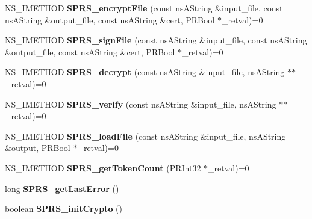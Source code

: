\begin{DoxyCompactItemize}
\item 
\hypertarget{classnsISPRS__PKCS11__Wrapper_af54922c905efcea0787d2a874d9a89a5}{
NS\_\-IMETHOD {\bfseries SPRS\_\-encryptFile} (const nsAString \&input\_\-file, const nsAString \&output\_\-file, const nsAString \&cert, PRBool $\ast$\_\-retval)=0}
\label{classnsISPRS__PKCS11__Wrapper_af54922c905efcea0787d2a874d9a89a5}

\item 
\hypertarget{classnsISPRS__PKCS11__Wrapper_a75f07f75db48863b369f7737322290af}{
NS\_\-IMETHOD {\bfseries SPRS\_\-signFile} (const nsAString \&input\_\-file, const nsAString \&output\_\-file, const nsAString \&cert, PRBool $\ast$\_\-retval)=0}
\label{classnsISPRS__PKCS11__Wrapper_a75f07f75db48863b369f7737322290af}

\item 
\hypertarget{classnsISPRS__PKCS11__Wrapper_ab427cbee7f436f59428c4623e60c0241}{
NS\_\-IMETHOD {\bfseries SPRS\_\-decrypt} (const nsAString \&input\_\-file, nsAString $\ast$$\ast$\_\-retval)=0}
\label{classnsISPRS__PKCS11__Wrapper_ab427cbee7f436f59428c4623e60c0241}

\item 
\hypertarget{classnsISPRS__PKCS11__Wrapper_ab7a5864e8c3884b39b76d87cf8bf7a29}{
NS\_\-IMETHOD {\bfseries SPRS\_\-verify} (const nsAString \&input\_\-file, nsAString $\ast$$\ast$\_\-retval)=0}
\label{classnsISPRS__PKCS11__Wrapper_ab7a5864e8c3884b39b76d87cf8bf7a29}

\item 
\hypertarget{classnsISPRS__PKCS11__Wrapper_a4014c1fdcaa95ba3655b68c68d03721c}{
NS\_\-IMETHOD {\bfseries SPRS\_\-loadFile} (const nsAString \&input\_\-file, nsAString \&output, PRBool $\ast$\_\-retval)=0}
\label{classnsISPRS__PKCS11__Wrapper_a4014c1fdcaa95ba3655b68c68d03721c}

\item 
\hypertarget{classnsISPRS__PKCS11__Wrapper_a0fb1d00e8b1e8c0d72a393c3dfcadbc9}{
NS\_\-IMETHOD {\bfseries SPRS\_\-getTokenCount} (PRInt32 $\ast$\_\-retval)=0}
\label{classnsISPRS__PKCS11__Wrapper_a0fb1d00e8b1e8c0d72a393c3dfcadbc9}

\item 
\hypertarget{classnsISPRS__PKCS11__Wrapper_aa1a33b3f4065b99d44dc5d8607ad0487}{
long {\bfseries SPRS\_\-getLastError} ()}
\label{classnsISPRS__PKCS11__Wrapper_aa1a33b3f4065b99d44dc5d8607ad0487}

\item 
\hypertarget{classnsISPRS__PKCS11__Wrapper_a0ae334160bc947c3ba068ad2bc12e683}{
boolean {\bfseries SPRS\_\-initCrypto} ()}
\label{classnsISPRS__PKCS11__Wrapper_a0ae334160bc947c3ba068ad2bc12e683}


\end{DoxyCompactItemize}
